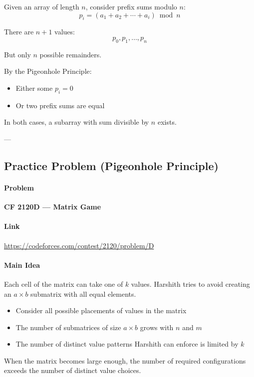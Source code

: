 \documentclass[11pt]{article}
\begin{document}
Given an array of length $n$, consider prefix sums modulo $n$:
\[
p_i = (a_1 + a_2 + \cdots + a_i) \bmod n
\]

There are $n+1$ values:
\[
p_0, p_1, \dots, p_n
\]

But only $n$ possible remainders.

By the Pigeonhole Principle:
\begin{itemize}
    \item Either some $p_i = 0$
    \item Or two prefix sums are equal
\end{itemize}

In both cases, a subarray with sum divisible by $n$ exists.

---
\subsection{Practice Problem (Pigeonhole Principle)}

\paragraph{Problem}
\textbf{CF 2120D — Matrix Game}

\paragraph{Link}
\url{https://codeforces.com/contest/2120/problem/D}

\paragraph{Main Idea}

Each cell of the matrix can take one of $k$ values.
Harshith tries to avoid creating an $a \times b$ submatrix with all equal elements.

\begin{itemize}
    \item Consider all possible placements of values in the matrix
    \item The number of submatrices of size $a \times b$ grows with $n$ and $m$
    \item The number of distinct value patterns Harshith can enforce is limited by $k$
\end{itemize}

When the matrix becomes large enough, the number of required configurations
exceeds the number of distinct value choices.
\end{document}
